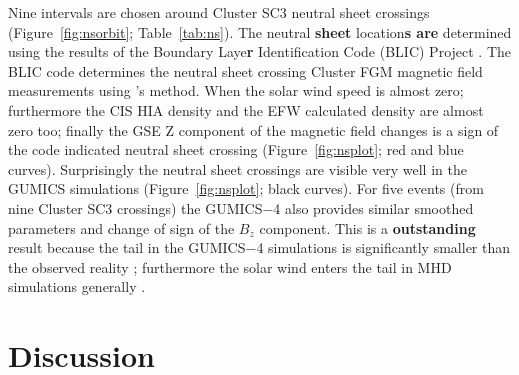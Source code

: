 \documentclass[linenumbers,draft]{agujournal}
\begin{document}
Nine intervals are chosen around Cluster SC3 neutral sheet crossings (Figure~\ref{fig:nsorbit}; Table~\ref{tab:ns}). The neutral \textbf{sheet} location\textbf{s are} determined using the results of the Boundary Laye\textbf{r} Identification Code (BLIC) Project \citep{facskoon:_bow_clust}. The BLIC code determines the neutral sheet crossing Cluster FGM magnetic field measurements using \citet{wang94:_signat}'s method. When the solar wind speed is almost zero; furthermore the CIS HIA density and the EFW calculated density are almost zero too; finally the GSE Z component of the magnetic field changes is a sign of the code indicated neutral sheet crossing (Figure~\ref{fig:nsplot}; red and blue curves). Surprisingly the neutral sheet crossings are visible very well in the GUMICS simulations (Figure~\ref{fig:nsplot}; black curves). For five events (from nine Cluster SC3 crossings) the GUMICS$-$4 also provides similar smoothed parameters and change of sign of the $B_{z}$ component. This is a \textbf{outstanding} result because the tail in the GUMICS$-$4 simulations is significantly smaller than the observed reality \citep{gordeev13:_verif_gumic_mhd,facsko16:_one_earth}; furthermore the solar wind enters the tail in MHD simulations generally \citep{kallio15:_proper}.

\section{Discussion}
\label{sec:discussion}
\end{document}
